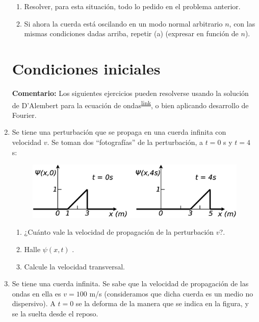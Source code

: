 \documentclass[11pt,spanish]{article}
\begin{document}
\begin{enumerate}
    \begin{enumerate}
    	\item Resolver, para esta situación, todo lo pedido en el problema
        anterior. 
    	\item Si ahora la cuerda está oscilando en un modo normal arbitrario $n$,
        con las mismas condiciones dadas arriba, repetir (a) (expresar en
        función de $n$).
    \end{enumerate}

    
\section*{Condiciones iniciales}

\textbf{Comentario:} Los siguientes ejercicios pueden resolverse usando la
solución de D'Alembert para la ecuación de ondas\textsuperscript{\href{https://en.wikipedia.org/wiki/D%
}{link}},
o bien aplicando desarrollo de Fourier.

    
    \item Se tiene una perturbación que se propaga en una cuerda infinita con
    velocidad $v$. Se toman dos ``fotografías'' de la perturbación, a $t=0$ s y
    $t=4$ s:

    \begin{figure}[H]
        \centering{}\includegraphics[clip,scale=0.25]{figs/ej2-2}
    \end{figure}

    \begin{enumerate}	
        \item ¿Cuánto vale la velocidad de propagación de la perturbación $v$?.
        \item Halle $\psi(x,t)$ .
        \item Calcule la velocidad transversal.
    \end{enumerate}
    


    \item Se tiene una cuerda infinita. Se sabe que la velocidad de propagación
    de las ondas en ella es $v=100$ m/s (consideramos que dicha cuerda es un
    medio no dispersivo). A $t=0$ se la deforma de la manera que se indica en la
    figura, y se la suelta desde el reposo.
    

\end{enumerate}
\end{document}
